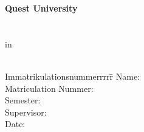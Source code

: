 \begin{centering}
\Large \textbf{Quest University} \\
\vfill
\LARGE \textbf{\Title} \\
\vfill
\LARGE \AsssignmentName \\ %
\Large in \\
\LARGE  \Class \\
\vfill
\begin{small}
\begin{doublespace}
	\begin{tabbing}
	Immatrikulationsnummerrrrr\=\kill
	Name:\>\Name\\
	Matriculation Nummer:\>\MatrikelNummer\\
	Semester:\>\Semester\\
	Supervisor:\>\Supervisor\\
	Date:\>\Date
	\end{tabbing}
\end{doublespace}
\end{small}



\end{centering}\vspace{1cm}